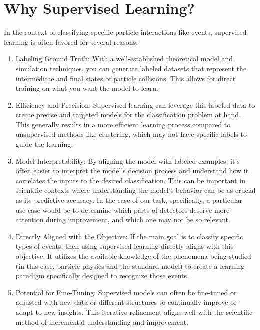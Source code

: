 \section{Why Supervised Learning?}
\label{appendix:why-supervised}

In the context of classifying specific particle interactions like \tth events, supervised learning is often favored for
several reasons:

\begin{enumerate}
      \item Labeling Ground Truth: With a well-established theoretical model and simulation techniques, you can generate
            labeled datasets that represent the intermediate and final states of particle collisions. This allows for
            direct training on what you want the model to learn.

      \item Efficiency and Precision: Supervised learning can leverage this labeled data to create precise and targeted
            models for the classification problem at hand. This generally results in a more efficient learning process
            compared to unsupervised methods like clustering, which may not have specific labels to guide the learning.

      \item Model Interpretability: By aligning the model with labeled examples, it's often easier to interpret the
            model's decision process and understand how it correlates the inputs to the desired classification. This can
            be important in scientific contexts where understanding the model's behavior can be as crucial as its
            predictive accuracy. In the case of our task, specifically, a particular use-case would be to determine which
            parts of detectors deserve more attention during improvement, and which one may not be so relevant.

      \item Directly Aligned with the Objective: If the main goal is to classify specific types of events, then using
            supervised learning directly aligns with this objective. It utilizes the available knowledge of the phenomena
            being studied (in this case, particle physics and the standard model) to create a learning paradigm
            specifically designed to recognize those events.

      \item Potential for Fine-Tuning: Supervised models can often be fine-tuned or adjusted with new data or different
            structures to continually improve or adapt to new insights. This iterative refinement aligns well with the
            scientific method of incremental understanding and improvement.


\end{enumerate}
